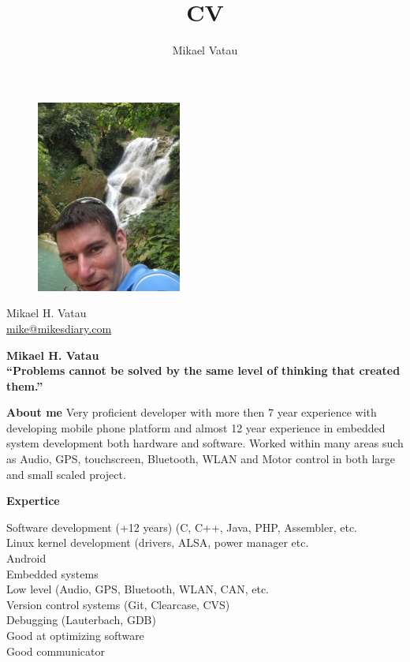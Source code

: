 \documentclass[a4paper,12pt,final]{memoir}
\author{Mikael Vatau}
\title{CV}
\newcommand{\Sep}{\vspace*{1.5em}}
\newcommand{\SmallSep}{\vspace*{0.5em}}
\newenvironment{AboutMe}
  {\ignorespaces\textbf{\color{RoyalBlue} About me}}
  {\Sep\ignorespacesafterend}
\newcommand{\CVSection}[1]
	{\Large\textbf{#1}\par
	\SmallSep\normalsize\normalfont}
\begin{document}
\begin{figure}
	\hfill
	\includegraphics[width=0.6\columnwidth,natwidth=180,natheight=180]{mesmall.jpeg}
	\vspace{-7cm}
\end{figure}

\begin{flushright}\small
	Mikael H. Vatau \\
	\url{mike@mikesdiary.com}  
\end{flushright}\normalsize
\framebreak

\Huge\bfseries {\color{RoyalBlue} Mikael H. Vatau} \\
\tiny\bfseries  “Problems cannot be solved by the same level of thinking that created them.”

\normalsize\normalfont
\Sep
\begin{AboutMe} %
  Very proficient developer with more then 7 year experience with developing mobile phone platform
  and almost 12 year experience in embedded system development both hardware and software.
  Worked within many areas such as Audio, GPS, touchscreen, Bluetooth, WLAN and Motor control in both
  large and small scaled project.
\end{AboutMe}

\CVSection{Expertice}
Software development (+12 years) (C, C++, Java, PHP, Assembler, etc.\\
Linux kernel development (drivers, ALSA, power manager etc.\\
Android\\ 
Embedded systems\\  
Low level (Audio, GPS, Bluetooth, WLAN, CAN, etc. \\ 
Version control systems (Git, Clearcase, CVS)\\
Debugging (Lauterbach, GDB) \\
Good at optimizing software \\
Good communicator\\
\Sep
\end{document}
